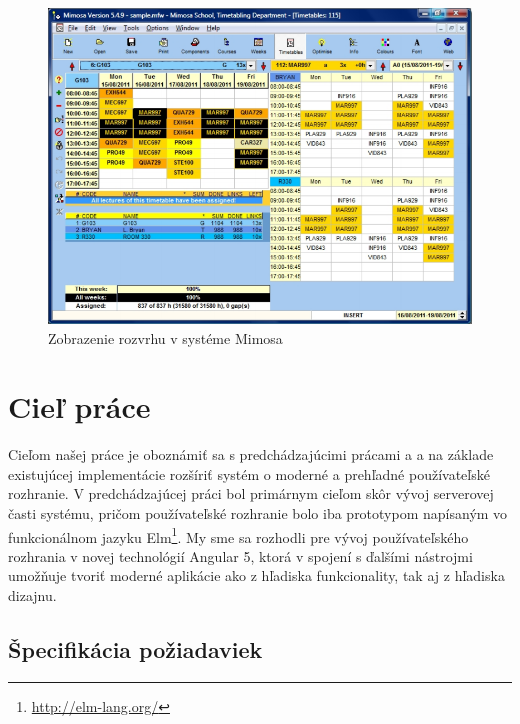 \begin{figure}[ht]
  \centering
  \includegraphics[width=0.71\columnwidth]{img/mimosa_2.png}
  \caption{\label{fig:mimosa2_gui} Zobrazenie rozvrhu v systéme Mimosa \cite{mimosa}}
\end{figure}

\section{Cieľ práce}
\label{sec:goal}

Cieľom našej práce je oboznámiť sa s predchádzajúcimi prácami \cite{knap} a \cite{racak} a na základe existujúcej
implementácie rozšíriť systém o moderné a prehľadné používateľské rozhranie. V predchádzajúcej
práci \cite{racak} bol primárnym cieľom skôr vývoj serverovej časti systému, pričom používateľské rozhranie
bolo iba prototypom napísaným vo funkcionálnom jazyku Elm\footnote{\url{http://elm-lang.org/}}.
My sme sa rozhodli pre vývoj
používateľského rozhrania v novej technológií Angular 5, ktorá v spojení s ďalšími nástrojmi
umožňuje tvoriť moderné aplikácie ako z hľadiska funkcionality, tak aj z hľadiska dizajnu.
\subsection{Špecifikácia požiadaviek}
\label{subsec:requirements}

